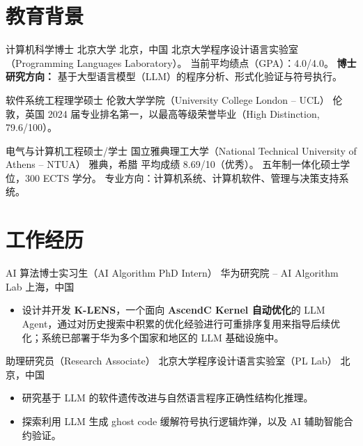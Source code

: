 \documentclass[11pt,a4paper,sans]{moderncv}
\begin{document}
\makecvtitle

\section{教育背景}

{计算机科学博士}
{北京大学}
{北京，中国}
{}
{
北京大学程序设计语言实验室（Programming Languages Laboratory）。
\newline 当前平均绩点（GPA）：4.0/4.0。
\newline \textbf{博士研究方向：} 基于大型语言模型（LLM）的程序分析、形式化验证与符号执行。
}

{软件系统工程理学硕士}
{伦敦大学学院（University College London -- UCL）}
{伦敦，英国}
{}
{
2024 届专业排名第一，以最高等级荣誉毕业（High Distinction, 79.6/100）。
}

{电气与计算机工程硕士/学士}
{国立雅典理工大学（National Technical University of Athens -- NTUA）}
{雅典，希腊}
{}
{
平均成绩 8.69/10（优秀）。
\newline 五年制一体化硕士学位，300 ECTS 学分。
\newline 专业方向：计算机系统、计算机软件、管理与决策支持系统。
}

\section{工作经历}

{AI 算法博士实习生（AI Algorithm PhD Intern）}
{华为研究院 -- AI Algorithm Lab}
{上海，中国}
{}
{
\begin{itemize}
    \item 设计并开发 \textbf{K-LENS}，一个面向 \textbf{AscendC Kernel 自动优化}的 LLM Agent，通过对历史搜索中积累的优化经验进行可重排序复用来指导后续优化；系统已部署于华为多个国家和地区的 LLM 基础设施中。
\end{itemize}
}

{助理研究员（Research Associate）}
{北京大学程序设计语言实验室（PL Lab）}
{北京，中国}
{}
{
\begin{itemize}
\item 研究基于 LLM 的软件遗传改进与自然语言程序正确性结构化推理。
\item 探索利用 LLM 生成 ghost code 缓解符号执行逻辑炸弹，以及 AI 辅助智能合约验证。
\end{itemize}
}
\end{document}
